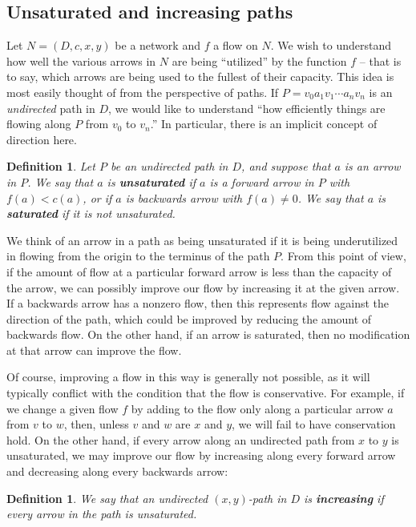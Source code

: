 \documentclass[12pt]{report}
\theoremstyle{plain}
\newtheorem{defn}[thm]{Definition}
\begin{document}
\subsection{Unsaturated and increasing paths}

Let $N = (D, c, x, y)$ be a network and $f$ a flow on $N$. We wish to
understand how well the various arrows in $N$ are being ``utilized'' by the
function $f$ -- that is to say, which arrows are being used to the fullest of
their capacity. This idea is most easily thought of from the perspective of
paths. If $P = v_0 a_1 v_1 \cdots a_n v_n$ is an \textit{undirected} path
in $D$, we would like to understand ``how efficiently things are flowing
along $P$ from $v_0$ to $v_n$.'' In particular, there is an implicit
concept of direction here.

\begin{defn}
Let $P$ be an undirected path in $D$, and suppose that $a$ is an arrow in
$P$. We say that $a$ is \textbf{unsaturated} if $a$ is a forward arrow in $P$ with $f(a) < c(a)$, or
if $a$ is backwards arrow with $f(a) \neq 0$. We say that $a$ is
\textbf{saturated} if it is
not unsaturated.
\end{defn}

We think of an arrow in a path as being unsaturated if it is being
underutilized in flowing from the origin to the terminus of the path $P$.
From this point of view, if the amount of flow at a particular forward
arrow is less than the capacity of the arrow, we can possibly improve our
flow by increasing it at the given arrow. If a backwards arrow has a
nonzero flow, then this represents flow against the direction of the path,
which could be improved by reducing the amount of backwards flow. On the
other hand, if an arrow is saturated, then no modification at that arrow
can improve the flow.

Of course, improving a flow in this way is generally not possible, as it
will typically conflict with the condition that the flow is conservative.
For example, if we change a given flow $f$ by adding to the flow only along
a particular arrow $a$ from $v$ to $w$, then, unless $v$ and $w$ are $x$
and $y$, we will fail to have conservation hold. On the other hand, if
every arrow along an undirected path from $x$ to $y$ is unsaturated, we may
improve our flow by increasing along every forward arrow and decreasing along
every backwards arrow:

\begin{defn}
We say that an undirected $(x,y)$-path in $D$ is
\textbf{increasing} if every
arrow in the path is unsaturated.
\end{defn}
\end{document}
